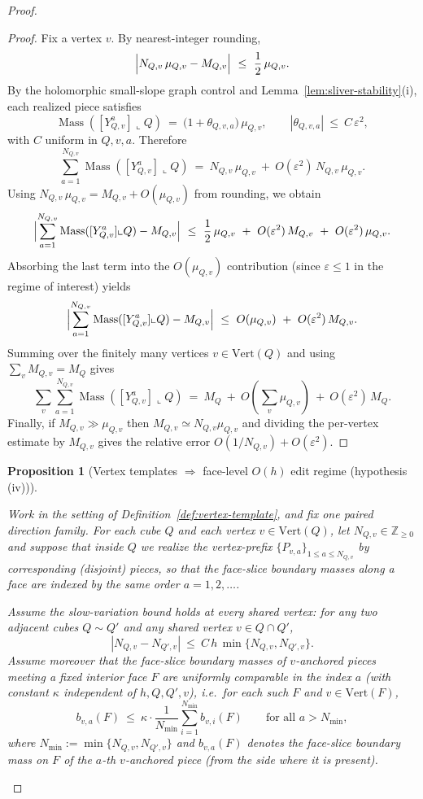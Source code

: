 \documentclass[11pt]{article}
\numberwithin{equation}{section}  %
\theoremstyle{plain}
\newtheorem{proposition}[theorem]{Proposition}
\theoremstyle{definition}
\theoremstyle{remark}
\newcommand{\Z}{\mathbb{Z}}
\DeclareMathOperator{\Mass}{Mass}
\begin{document}
\begin{proof}
\begin{proof}

Fix a vertex $v$.  By nearest-integer rounding,
\[
\Bigl|N_{Q,v}\,\mu_{Q,v}-M_{Q,v}\Bigr|\ \le\ \frac12\,\mu_{Q,v}.
\]
By the holomorphic small-slope graph control and Lemma~\ref{lem:sliver-stability}\textnormal{(i)}, each realized piece satisfies
\[
\Mass([Y_{Q,v}^a]\llcorner Q)\ =\ \bigl(1+\theta_{Q,v,a}\bigr)\,\mu_{Q,v},
\qquad |\theta_{Q,v,a}|\ \le\ C\,\varepsilon^2,
\]
with $C$ uniform in $Q,v,a$.
Therefore
\[
\sum_{a=1}^{N_{Q,v}}\Mass([Y_{Q,v}^a]\llcorner Q)
\ =\ N_{Q,v}\,\mu_{Q,v}\ +\ O(\varepsilon^2)\,N_{Q,v}\,\mu_{Q,v}.
\]
Using $N_{Q,v}\,\mu_{Q,v}=M_{Q,v}+O(\mu_{Q,v})$ from rounding, we obtain
\[
\Bigl|\sum_{a=1}^{N_{Q,v}}\Mass([Y_{Q,v}^a]\llcorner Q)-M_{Q,v}\Bigr|
\ \le\ \frac12\,\mu_{Q,v}\ +\ O(\varepsilon^2)\,M_{Q,v}\ +\ O(\varepsilon^2)\,\mu_{Q,v}.
\]
Absorbing the last term into the $O(\mu_{Q,v})$ contribution (since $\varepsilon\le 1$ in the regime of interest) yields
\[
\Bigl|\sum_{a=1}^{N_{Q,v}}\Mass([Y_{Q,v}^a]\llcorner Q)-M_{Q,v}\Bigr|
\ \le\ O(\mu_{Q,v})\ +\ O(\varepsilon^2)\,M_{Q,v}.
\]
Summing over the finitely many vertices $v\in\mathrm{Vert}(Q)$ and using $\sum_v M_{Q,v}=M_Q$ gives
\[
\sum_{v}\sum_{a=1}^{N_{Q,v}} \Mass([Y_{Q,v}^a]\llcorner Q)
\ =\ M_Q\ +\ O\!\left(\sum_{v}\mu_{Q,v}\right)\ +\ O(\varepsilon^2)\,M_Q.
\]
Finally, if $M_{Q,v}\gg \mu_{Q,v}$ then $M_{Q,v}\simeq N_{Q,v}\mu_{Q,v}$ and dividing the per-vertex estimate by $M_{Q,v}$ gives the relative error
\(O(1/N_{Q,v})+O(\varepsilon^2)\).

\end{proof}



\begin{proposition}[Vertex templates $\Rightarrow$ face-level $O(h)$ edit regime (hypothesis \textnormal{(iv)})]\label{prop:vertex-template-face-edits}

Work in the setting of Definition~\ref{def:vertex-template}, and fix one paired direction family.
For each cube $Q$ and each vertex $v\in\mathrm{Vert}(Q)$, let $N_{Q,v}\in\Z_{\ge 0}$ and suppose that inside $Q$ we realize the
vertex-prefix $\{P_{v,a}\}_{1\le a\le N_{Q,v}}$ by corresponding (disjoint) pieces, so that the face-slice boundary masses along a face
are indexed by the same order $a=1,2,\dots$.

Assume the \emph{slow-variation} bound holds at every shared vertex: for any two adjacent cubes $Q\sim Q'$ and any shared vertex
$v\in Q\cap Q'$,
\[
|N_{Q,v}-N_{Q',v}|\ \le\ C\,h\,\min\{N_{Q,v},N_{Q',v}\}.
\]
Assume moreover that the face-slice boundary masses of $v$-anchored pieces meeting a fixed interior face $F$ are uniformly comparable
in the index $a$ (with constant $\kappa$ independent of $h,Q,Q',v$), i.e.\ for each such $F$ and $v\in\mathrm{Vert}(F)$,
\[
b_{v,a}(F)\ \le\ \kappa\cdot \frac{1}{N_{\min}}\sum_{i=1}^{N_{\min}} b_{v,i}(F)
\qquad\text{for all }a>N_{\min},
\]
where $N_{\min}:=\min\{N_{Q,v},N_{Q',v}\}$ and $b_{v,a}(F)$ denotes the face-slice boundary mass on $F$ of the $a$-th $v$-anchored piece
(from the side where it is present).


\end{proposition}
\end{proof}
\end{document}
